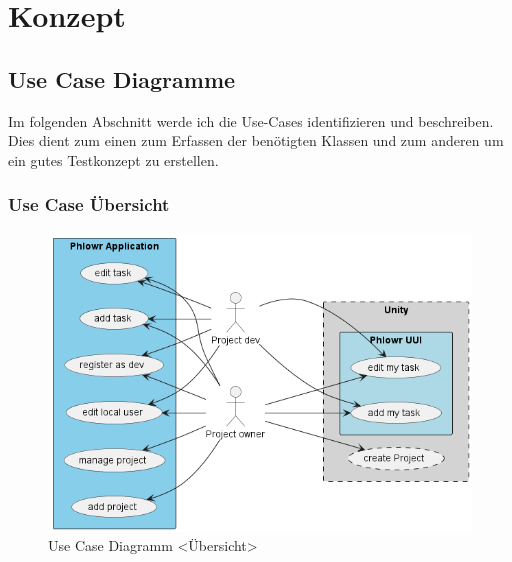 \section{Konzept}

\subsection{Use Case Diagramme}
Im folgenden Abschnitt werde ich die Use-Cases identifizieren und beschreiben.\\
Dies dient zum einen zum Erfassen der benötigten Klassen und zum anderen um ein gutes Testkonzept zu erstellen.
 
\subsubsection{Use Case Übersicht}
\begin{figure}[H]
    \begin{center}
      \includegraphics[width=1\linewidth]{../content/diagrams/usecase/overview/overviewUseCase.png}
      \caption{Use Case Diagramm <Übersicht>}
    \end{center}
  \end{figure}

  \newpage

\newpage

 \newpage

